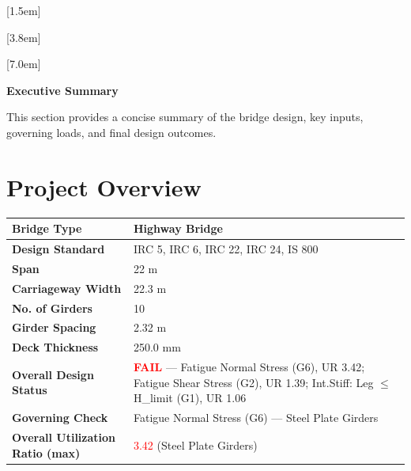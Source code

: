 \documentclass[12pt,a4paper]{report}
\numberwithin{table}{chapter}
\numberwithin{figure}{chapter}
\begin{document}
[1.5em]
  {\normalfont\vspace{2pt}}
  {\contentslabel{1.5em}}
  {\hspace*{-1.5em}}
  {\hfill\contentspage}

[3.8em]
  {\normalfont}
  {\contentslabel{2.3em}}
  {\hspace*{-2.3em}}
  {\hfill\contentspage}

[7.0em]
  {\normalfont}
  {\contentslabel{3.2em}}
  {\hspace*{-3.2em}}
  {\hfill\contentspage}

\newpage
\renewcommand{\contentsname}{\centering\Large\bfseries Table of Contents}
\tableofcontents


\newpage
{\centering\Large\bfseries Executive Summary\par}
\vspace{0.8em}

This section provides a concise summary of the bridge design, key inputs, governing loads, and final design outcomes.

\section*{Project Overview}
\label{sec:project-overview}


\begin{tabular}{|L{5.5cm}|L{8.5cm}|}
\hline
\textbf{Bridge Type} & Highway Bridge \\
\hline
\textbf{Design Standard} & IRC 5, IRC 6, IRC 22, IRC 24, IS 800 \\
\hline
\textbf{Span} & 22 m \\
\hline
\textbf{Carriageway Width} & 22.3 m \\
\hline
\textbf{No. of Girders} & 10 \\
\hline
\textbf{Girder Spacing} & 2.32 m \\
\hline
\textbf{Deck Thickness} & 250.0 mm \\
\hline
\textbf{Overall Design Status} & \textcolor{red}{\textbf{FAIL}} --- Fatigue Normal Stress (G6), UR 3.42; Fatigue Shear Stress (G2), UR 1.39; Int.Stiff:\allowbreak{} Leg \ensuremath{\leq} H\_\allowbreak{}limit (G1), UR 1.06 \\
\hline
\textbf{Governing Check} & Fatigue Normal Stress (G6) --- Steel Plate Girders \\
\hline
\textbf{Overall Utilization Ratio (max)} & \textcolor{red}{3.42} (Steel Plate Girders) \\
\hline
\end{tabular}
\end{document}
